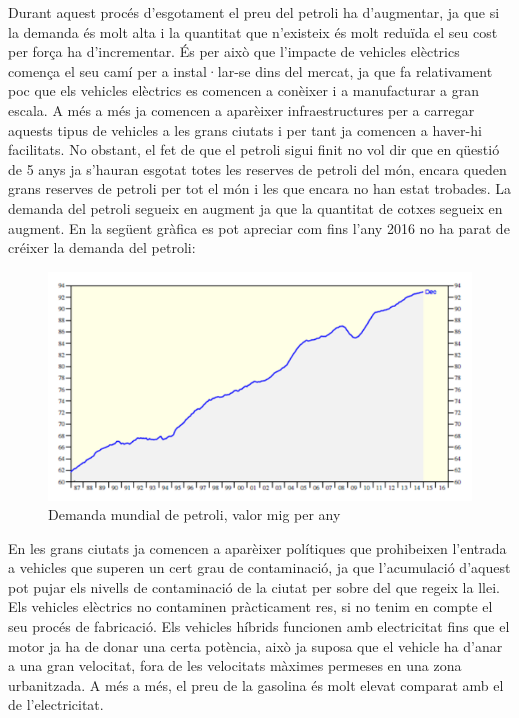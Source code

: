 Durant aquest procés d'esgotament el preu del petroli ha d'augmentar, ja que si la demanda és molt alta i la quantitat que n'existeix és molt reduïda el seu cost per força ha d'incrementar. És per això que l'impacte de vehicles elèctrics comença el seu camí per a instal·lar-se dins del mercat, ja que fa relativament poc que els vehicles elèctrics es comencen a conèixer i a manufacturar a gran escala. A més a més ja comencen a aparèixer infraestructures per a carregar aquests tipus de vehicles a les grans ciutats i per tant ja comencen a haver-hi facilitats. 
\newline
No obstant, el fet de que el petroli sigui finit no vol dir que en qüestió de 5 anys ja s'hauran esgotat totes les reserves de petroli del món, encara queden grans reserves de petroli per tot el món i les que encara no han estat trobades. La demanda del petroli segueix en augment ja que la quantitat de cotxes segueix en augment. En la següent gràfica es pot apreciar com fins l'any 2016 no ha parat de créixer la demanda del petroli:
\bigskip

\begin{figure}[H]
		\centering
    	\includegraphics[width=\textwidth]{Marcteoric/Augmentdemandapetroli.png}
     	\caption{Demanda mundial de petroli, valor mig per any}
\end{figure}

\newpage

En les grans ciutats ja comencen a aparèixer polítiques que prohibeixen l'entrada a vehicles que superen un cert grau de contaminació, ja que l'acumulació d'aquest pot pujar els nivells de contaminació de la ciutat per sobre del que regeix la llei. Els vehicles elèctrics no contaminen \newline pràcticament res, si no tenim en compte el seu procés de fabricació. Els vehicles híbrids funcionen amb electricitat fins que el motor ja ha de donar una certa potència, això ja suposa que el vehicle ha d'anar a una gran velocitat, fora de les velocitats màximes permeses en una zona urbanitzada. A més a més, el preu de la gasolina és molt elevat comparat amb el de l'electricitat. 

